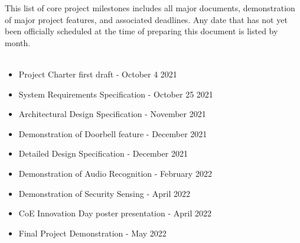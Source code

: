 This list of core project milestones includes all major documents, demonstration of major project features, and associated deadlines. Any date that has not yet been officially scheduled at the time of preparing this document is listed by month.
\\
\\
\begin{itemize}
  \item Project Charter first draft - October 4 2021
  \item System Requirements Specification - October 25 2021
  \item Architectural Design Specification - November 2021
  \item Demonstration of Doorbell feature - December 2021
  \item Detailed Design Specification - December 2021
  \item Demonstration of Audio Recognition - February 2022
  \item Demonstration of Security Sensing - April 2022
  \item CoE Innovation Day poster presentation - April 2022
  \item Final Project Demonstration - May 2022
\end{itemize}